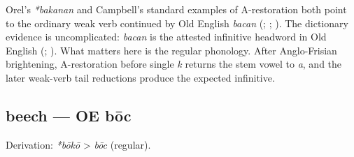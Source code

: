 \documentclass[
  british,
  a4paper,
]{article}
\begin{document}
Orel's \emph{*bakanan} and Campbell's standard examples of A-restoration
both point to the ordinary weak verb continued by Old English
\emph{bacan} (;
;
). The
dictionary evidence is uncomplicated: \emph{bacan} is the attested
infinitive headword in Old English
(;
). What matters here is
the regular phonology. After Anglo-Frisian brightening, A-restoration
before single \emph{k} returns the stem vowel to \emph{a}, and the later
weak-verb tail reductions produce the expected infinitive.

\subsection{beech --- OE bōc}\label{beech-oe-bux14dc}

Derivation: \emph{*bōkō} \textgreater{} \emph{bōc} (regular).

\begingroup
\setlength{\fboxsep}{6pt}
\end{document}
